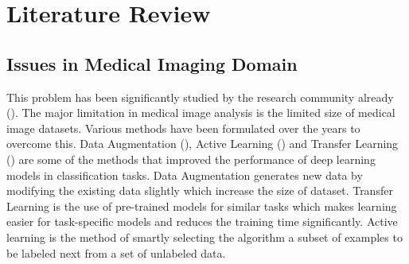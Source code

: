 
\chapter{Literature Review}\label{chap:litreview}
\ifpdf
    \graphicspath{{Chapter1/Chapter1Figs/PNG/}{Chapter1/Chapter1Figs/PDF/}{Chapter1/Chapter1Figs/}}
\else
    \graphicspath{{Chapter1/Chapter1Figs/EPS/}{Chapter1/Chapter1Figs/}}
\fi

\section{Issues in Medical Imaging Domain}

This problem has been significantly studied by the research community already (\cite{liu2019comparison}). The major limitation in medical image analysis is the limited size of medical image datasets. Various methods have been formulated over the years to overcome this. Data Augmentation (\cite{perez2017effectiveness}), Active Learning (\cite{hino2020active}) and Transfer Learning (\cite{tan2018survey}) are some of the methods that improved the performance of deep learning models in classification tasks. Data Augmentation generates new data by modifying the existing data slightly which increase the size of dataset. Transfer Learning is the use of pre-trained models for similar tasks which makes learning easier for task-specific models and reduces the training time significantly. Active learning is the method of smartly selecting the algorithm a subset of examples to be labeled next from a set of unlabeled data. 


